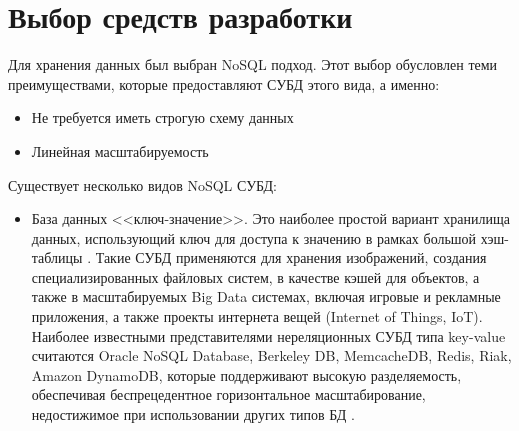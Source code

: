 \documentclass[14pt]{extreport}
\begin{document}
\chapter{Выбор средств разработки}
Для хранения данных был выбран NoSQL подход. Этот выбор обусловлен теми преимуществами, которые предоставляют СУБД этого вида, а именно:
\begin{itemize}
\item Не требуется иметь строгую схему данных
\item Линейная масштабируемость
\end{itemize}

Существует несколько видов NoSQL СУБД:
\begin{itemize}
	
\item База данных <<ключ-значение>>. Это наиболее простой вариант хранилища данных, использующий ключ для доступа к значению в рамках большой хэш-таблицы \cite{nosqlAws}. Такие СУБД применяются для хранения изображений, создания специализированных файловых систем, в качестве кэшей для объектов, а также в масштабируемых Big Data системах, включая игровые и рекламные приложения, а также проекты интернета вещей (Internet of Things, IoT). Наиболее известными представителями нереляционных СУБД типа key-value считаются Oracle NoSQL Database, Berkeley DB, MemcacheDB, Redis, Riak, Amazon DynamoDB, которые поддерживают высокую разделяемость, обеспечивая беспрецедентное горизонтальное масштабирование, недостижимое при использовании других типов БД \cite{nosqlTp}.



\end{itemize}
\end{document}
